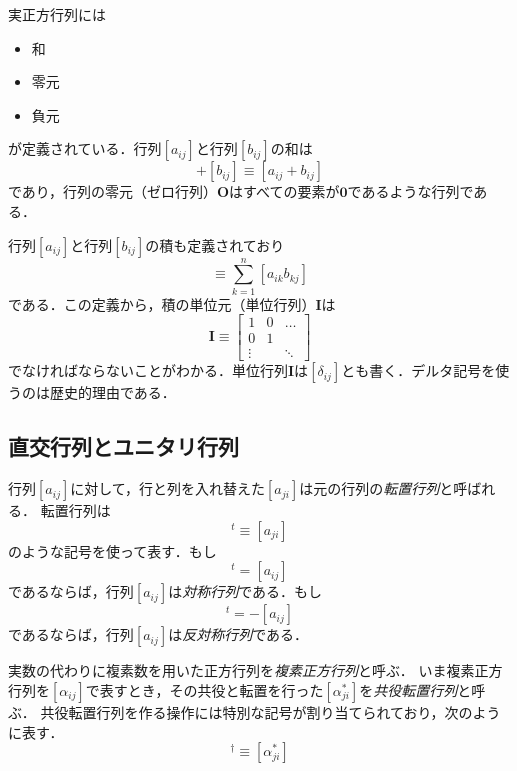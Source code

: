 \documentclass{jsbook}
\newcommand{\keyword}[1]{\emph{#1}}
\newcommand{\zero}{\mathbf{0}}
\newcommand{\Zero}{\mathbf{O}}
\newcommand{\One}{\mathbf{I}}
\begin{document}
実正方行列には
\begin{itemize}
\item 和
\item 零元
\item 負元
\end{itemize}
が定義されている．行列$[a_{ij}]$と行列$[b_{ij}]$の和は
\begin{equation}
[a_{ij}]+[b_{ij}]\equiv[a_{ij}+b_{ij}]
\end{equation}
であり，行列の零元（ゼロ行列）$\Zero$はすべての要素が$\zero$であるような行列である．

行列$[a_{ij}]$と行列$[b_{ij}]$の積も定義されており
\begin{equation}
[a_{ij}][b_{ij}]\equiv\sum_{k=1}^n[a_{ik}b_{kj}]
\end{equation}
である．この定義から，積の単位元（単位行列）$\One$は
\begin{equation}
\One\equiv\begin{bmatrix}1&0&\dots\\
  0&1\\
  \vdots&&\ddots\end{bmatrix}
\end{equation}
でなければならないことがわかる．単位行列$\One$は$[\delta_{ij}]$とも書く．デルタ記号を使うのは歴史的理由である．

\subsection{直交行列とユニタリ行列}

行列$[a_{ij}]$に対して，行と列を入れ替えた$[a_{ji}]$は元の行列の\keyword{転置行列}と呼ばれる．
転置行列は
\begin{equation}
[a_{ij}]^t\equiv[a_{ji}]
\end{equation}
のような記号を使って表す．もし
\begin{equation}
[a_{ij}]^t=[a_{ij}]
\end{equation}
であるならば，行列$[a_{ij}]$は\keyword{対称行列}である．もし
\begin{equation}
[a_{ij}]^t=-[a_{ij}]
\end{equation}
であるならば，行列$[a_{ij}]$は\keyword{反対称行列}である．

実数の代わりに複素数を用いた正方行列を\keyword{複素正方行列}と呼ぶ．
いま複素正方行列を$[\alpha_{ij}]$で表すとき，その共役と転置を行った$[\alpha^*_{ji}]$を\keyword{共役転置行列}と呼ぶ．
共役転置行列を作る操作には特別な記号が割り当てられており，次のように表す．
\begin{equation}
[\alpha_{ij}]^\dagger\equiv[\alpha^*_{ji}]
\end{equation}
\end{document}
